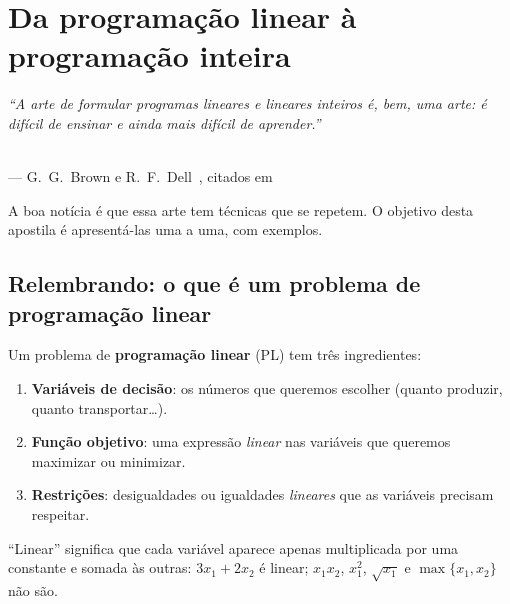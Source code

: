 \chapter{Da programação linear à programação inteira}
\label{cap:pl-pi}

\begin{flushright}
\begin{minipage}{0.75\linewidth}\itshape\small
``A arte de formular programas lineares e lineares inteiros é, bem, uma arte: é difícil de ensinar e ainda mais
difícil de aprender.''
\end{minipage}\\[2pt]
{\small --- G.~G.~Brown e R.~F.~Dell~\cite{browndell2007}, citados em~\cite{ravelo}}
\end{flushright}

A boa notícia é que essa arte tem técnicas que se repetem. O objetivo desta apostila é apresentá-las uma a uma,
com exemplos.

\section{Relembrando: o que é um problema de programação linear}

Um problema de \textbf{programação linear} (PL) tem três ingredientes:
\begin{enumerate}
  \item \textbf{Variáveis de decisão}: os números que queremos escolher (quanto produzir, quanto transportar\ldots).
  \item \textbf{Função objetivo}: uma expressão \emph{linear} nas variáveis que queremos maximizar ou minimizar.
  \item \textbf{Restrições}: desigualdades ou igualdades \emph{lineares} que as variáveis precisam respeitar.
\end{enumerate}
``Linear'' significa que cada variável aparece apenas multiplicada por uma constante e somada às outras: $3x_1 + 2x_2$
é linear; $x_1x_2$, $x_1^2$, $\sqrt{x_1}$ e $\max\{x_1,x_2\}$ não são.

